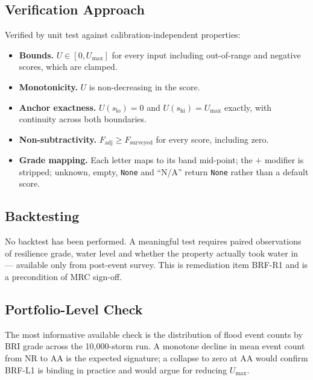 \documentclass[11pt,a4paper]{article}
\begin{document}


\mkmvalidation

\subsection{Verification Approach}
Verified by unit test against calibration-independent properties:

\begin{itemize}
  \item \textbf{Bounds.} $U \in [0, U_{\max}]$ for every input including
        out-of-range and negative scores, which are clamped.
  \item \textbf{Monotonicity.} $U$ is non-decreasing in the score.
  \item \textbf{Anchor exactness.} $U(s_{\text{lo}}) = 0$ and
        $U(s_{\text{hi}}) = U_{\max}$ exactly, with continuity across both
        boundaries.
  \item \textbf{Non-subtractivity.} $F_{\text{adj}} \ge F_{\text{surveyed}}$ for
        every score, including zero.
  \item \textbf{Grade mapping.} Each letter maps to its band mid-point; the
        $+$ modifier is stripped; unknown, empty, \texttt{None} and ``N/A''
        return \texttt{None} rather than a default score.
\end{itemize}

\subsection{Backtesting}
No backtest has been performed. A meaningful test requires paired observations
of resilience grade, water level and whether the property actually took water
in --- available only from post-event survey. This is remediation item BRF-R1
and is a precondition of MRC sign-off.

\subsection{Portfolio-Level Check}
The most informative available check is the distribution of flood event counts
by BRI grade across the 10{,}000-storm run. A monotone decline in mean event
count from NR to AA is the expected signature; a collapse to zero at AA would
confirm BRF-L1 is binding in practice and would argue for reducing $U_{\max}$.
\end{document}
